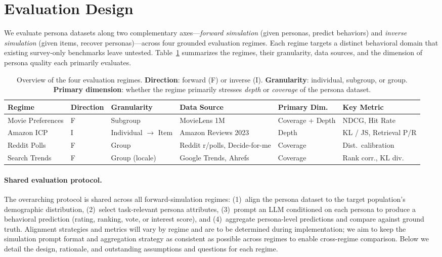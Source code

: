 \section{Evaluation Design}
\label{sec:experiments}

We evaluate persona datasets along two complementary axes---\emph{forward simulation} (given personas, predict behaviors) and \emph{inverse simulation} (given items, recover personas)---across four grounded evaluation regimes.
Each regime targets a distinct behavioral domain that existing survey-only benchmarks leave untested.
Table~\ref{tab:eval-overview} summarizes the regimes, their granularity, data sources, and the dimension of persona quality each primarily evaluates.

\begin{table}[t]
\centering
\caption{Overview of the four evaluation regimes. \textbf{Direction}: forward (F) or inverse (I). \textbf{Granularity}: individual, subgroup, or group. \textbf{Primary dimension}: whether the regime primarily stresses \emph{depth} or \emph{coverage} of the persona dataset.}
\label{tab:eval-overview}
\small
\begin{tabular}{@{}llllll@{}}
\toprule
\textbf{Regime} & \textbf{Direction} & \textbf{Granularity} & \textbf{Data Source} & \textbf{Primary Dim.} & \textbf{Key Metric} \\
\midrule
Movie Preferences & F & Subgroup & MovieLens 1M & Coverage + Depth & NDCG, Hit Rate \\
Amazon ICP & I & Individual $\to$ Item & Amazon Reviews 2023 & Depth & KL / JS, Retrieval P/R \\
Reddit Polls & F & Group & Reddit r/polls, Decide-for-me & Coverage & Dist.\ calibration \\
Search Trends & F & Group (locale) & Google Trends, Ahrefs & Coverage & Rank corr., KL div. \\
\bottomrule
\end{tabular}
\end{table}

\paragraph{Shared evaluation protocol.}
The overarching protocol is shared across all forward-simulation regimes: (1)~align the persona dataset to the target population's demographic distribution, (2)~select task-relevant persona attributes, (3)~prompt an LLM conditioned on each persona to produce a behavioral prediction (rating, ranking, vote, or interest score), and (4)~aggregate persona-level predictions and compare against ground truth.
Alignment strategies and metrics will vary by regime and are to be determined during implementation; we aim to keep the simulation prompt format and aggregation strategy as consistent as possible across regimes to enable cross-regime comparison.
Below we detail the design, rationale, and outstanding assumptions and questions for each regime.


